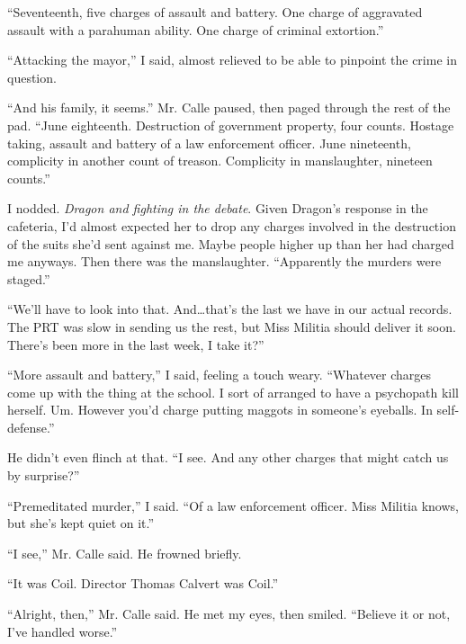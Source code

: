 ``Seventeenth, five charges of assault and battery.  One charge of aggravated assault with a parahuman ability.  One charge of criminal extortion.''



``Attacking the mayor,'' I said, almost relieved to be able to pinpoint the crime in question.



``And his family, it seems.''  Mr. Calle paused, then paged through the rest of the pad.  ``June eighteenth.  Destruction of government property, four counts.  Hostage taking, assault and battery of a law enforcement officer.  June nineteenth, complicity in another count of treason.  Complicity in manslaughter, nineteen counts.''



I nodded.  \emph{Dragon and fighting in the debate}.  Given Dragon's response in the cafeteria, I'd almost expected her to drop any charges involved in the destruction of the suits she'd sent against me.  Maybe people higher up than her had charged me anyways.  Then there was the manslaughter.  ``Apparently the murders were staged.''



``We'll have to look into that.  And\ldots that's the last we have in our actual records.  The PRT was slow in sending us the rest, but Miss Militia should deliver it soon.  There's been more in the last week, I take it?''



``More assault and battery,'' I said, feeling a touch weary.  ``Whatever charges come up with the thing at the school.  I sort of arranged to have a psychopath kill herself.  Um.  However you'd charge putting maggots in someone's eyeballs.  In self-defense.''



He didn't even flinch at that.  ``I see.  And any other charges that might catch us by surprise?''



``Premeditated murder,'' I said.  ``Of a law enforcement officer.  Miss Militia knows, but she's kept quiet on it.''



``I see,'' Mr. Calle said.  He frowned briefly.



``It was Coil.  Director Thomas Calvert was Coil.''



``Alright, then,'' Mr. Calle said.  He met my eyes, then smiled.  ``Believe it or not, I've handled worse.''



